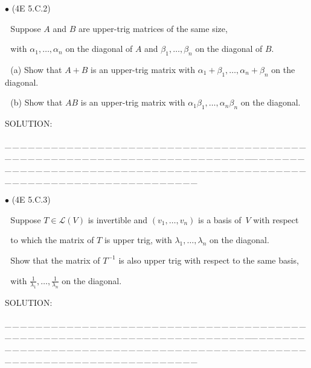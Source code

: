 \documentclass[a4paper, 11pt, UTF8]{article}
\def\Lm{\mathcal{L}}
\begin{document}
\begin{large}
{\small $\bullet$} ({\normalsize4E 5.C.2})\par\,\, {\timessl\Large 
Suppose $A$ and $B$ are upper-trig matrices of the same size,}\par\,\,
{\timessl\Large with $\alpha_1 , \dots , \alpha_n$ on the diagonal of $A$ and $\beta_1 , \dots , \beta_n$ on the diagonal of $B$.
}\par\,\,
(a) {\timessl\Large Show that $A + B$ is an upper-trig matrix with $\alpha_1 + \beta_1 , \dots , \alpha_n + \beta_n$ on the diagonal.
}\par\,\,
(b) {\timessl\Large Show that $AB$ is an upper-trig matrix with $\alpha_1 \beta_1 , \dots , \alpha_n \beta_n$ on the diagonal.
}\par
{\timesbf S\footnotesize{OLUTION:}}\par\quad

\par
{\tiny \_\,\_\,\_\,\_\,\_\,\_\,\_\,\_\,\_\,\_\,\_\,\_\,\_\,\_\,\_\,\_\,\_\,\_\,\_\,\_\,\_\,\_\,\_\,\_\,\_\,\_\,\_\,\_\,\_\,\_\,\_\,\_\,\_\,\_\,\_\,\_\,\_\,\_\,\_\,\_\,\_\,\_\,\_\,\_\,\_\,\_\,\_\,\_\,\_\,\_\,\_\,\_\,\_\,\_\,\_\,\_\,\_\,\_\,\_\,\_\,\_\,\_\,\_\,\_\,\_\,\_\,\_\,\_\,\_\,\_\,\_\_\,\_\,\_\,\_\,\_\,\_\,\_\,\_\,\_\,\_\,\_\,\_\,\_\,\_\,\_\,\_\,\_\,\_\,\_\,\_\,\_\,\_\,\_\,\_\,\_\,\_\,\_\,\_\,\_\,\_\,\_\,\_\,\_\,\_\,\_\,\_\,\_\,\_\,\_\,\_\,\_\,\_\,\_\,\_\,\_\,\_\,\_\,\_\,\_\,\_\,\_\,\_\,\_\,\_\,\_\,\_\,\_\,\_\,\_\,\_\,\_\,\_\,\_\,\_\,\_\,\_\,\_\,\_\,\_\,\_\,\_}\par

{\small $\bullet$} ({\normalsize4E 5.C.3})\par\,\, {\timessl\Large 
Suppose $T\in \Lm(V)$ is invertible and $(v_1 , \dots , v_n)$ is a basis of \,$V$ with respect}\par\,\,
{\timessl\Large to which the matrix of $T$ is upper trig, with $\lambda_1 , \dots , \lambda_n$ on the diagonal.}\par\,\,
{\timessl\Large
Show that the matrix of $T^{-1}$ is also upper trig with respect to the same basis,}\par\,\,
{\timessl\Large with
{\normalsize$\displaystyle\frac{1}{\lambda_1},\dots,\frac{1}{\lambda_n}$} on the diagonal.
}\par
{\timesbf S\footnotesize{OLUTION:}}\par\quad

\par
{\tiny \_\,\_\,\_\,\_\,\_\,\_\,\_\,\_\,\_\,\_\,\_\,\_\,\_\,\_\,\_\,\_\,\_\,\_\,\_\,\_\,\_\,\_\,\_\,\_\,\_\,\_\,\_\,\_\,\_\,\_\,\_\,\_\,\_\,\_\,\_\,\_\,\_\,\_\,\_\,\_\,\_\,\_\,\_\,\_\,\_\,\_\,\_\,\_\,\_\,\_\,\_\,\_\,\_\,\_\,\_\,\_\,\_\,\_\,\_\,\_\,\_\,\_\,\_\,\_\,\_\,\_\,\_\,\_\,\_\,\_\,\_\_\,\_\,\_\,\_\,\_\,\_\,\_\,\_\,\_\,\_\,\_\,\_\,\_\,\_\,\_\,\_\,\_\,\_\,\_\,\_\,\_\,\_\,\_\,\_\,\_\,\_\,\_\,\_\,\_\,\_\,\_\,\_\,\_\,\_\,\_\,\_\,\_\,\_\,\_\,\_\,\_\,\_\,\_\,\_\,\_\,\_\,\_\,\_\,\_\,\_\,\_\,\_\,\_\,\_\,\_\,\_\,\_\,\_\,\_\,\_\,\_\,\_\,\_\,\_\,\_\,\_\,\_\,\_\,\_\,\_\,\_}\par


\end{large}
\end{document}
